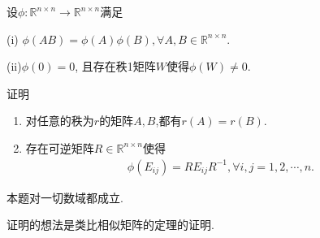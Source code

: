 \documentclass[../../main.tex]{subfiles}%
\begin{document}
\begin{theorem}
设$\phi: \mathbb{R}^{n \times n} \to \mathbb{R}^{n \times n}$满足

(i) $\phi(AB) = \phi(A)\phi(B), \forall A,B \in \mathbb{R}^{n \times n}$.

(ii)$\phi(0) = 0$, 且存在秩1矩阵$W$使得$\phi(W) \neq 0$.

证明
\begin{enumerate}[(1)]
\item 对任意的秩为$r$的矩阵$A,B$,都有$r(A)=r(B).$

\item 存在可逆矩阵$R \in \mathbb{R}^{n \times n}$使得
\begin{align}
\phi(E_{ij}) = R E_{ij} R^{-1}, \forall i,j = 1,2,\cdots,n. \label{eq:23.81}
\end{align}
\end{enumerate}
\end{theorem}
\begin{note}
本题对一切数域都成立.

证明的想法是类比相似矩阵的定理的证明. 
\end{note}
\end{document}

